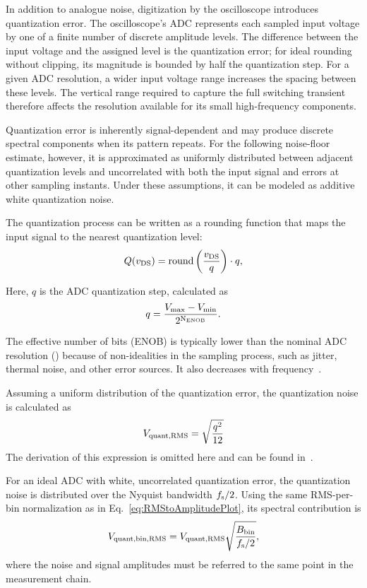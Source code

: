 In addition to analogue noise, digitization by the oscilloscope introduces quantization error.
The oscilloscope's ADC represents each sampled input voltage by one of a finite number of discrete amplitude levels.
The difference between the input voltage and the assigned level is the quantization error; for ideal rounding without clipping, its magnitude is bounded by half the quantization step.
For a given ADC resolution, a wider input voltage range increases the spacing between these levels.
The vertical range required to capture the full switching transient therefore affects the resolution available for its small high-frequency components.

Quantization error is inherently signal-dependent and may produce discrete spectral components when its pattern repeats. 
For the following noise-floor estimate, however, it is approximated as uniformly distributed between adjacent quantization levels and uncorrelated with both the input signal and errors at other sampling instants. 
Under these assumptions, it can be modeled as additive white quantization noise.

The quantization process can be written as a rounding function that maps the input signal to the nearest quantization level:
\begin{equation}
	Q({v}_{\mathrm{DS}}) = \text{round}\left(\frac{{v}_{\mathrm{DS}}}{q}\right) \cdot q,
	\label{eq:quantization}
\end{equation}

Here, $q$ is the ADC quantization step, calculated as
\begin{equation}
	q = \dfrac{{V}_{\mathrm{max}}-{V}_{\mathrm{min}}}{2^{\text{N}_{\text{ENOB}}}}.
\end{equation}

The effective number of bits (ENOB) is typically lower than the nominal ADC resolution () because of non-idealities in the sampling process, such as jitter, thermal noise, and other error sources. It also decreases with frequency~\cite{tektronix_mso_2026}.

Assuming a uniform distribution of the quantization error, the quantization noise is calculated as
\begin{equation}
	{V}_{\mathrm{quant,RMS}} = \sqrt{\frac{q^2}{12}}
\end{equation}
The derivation of this expression is omitted here and can be found in~\cite{silicon_laboratories_an118_2013}.

For an ideal ADC with white, uncorrelated quantization error, the quantization noise is distributed over the Nyquist bandwidth ${f}_{\mathrm{s}}/2$.
Using the same RMS-per-bin normalization as in Eq.~\ref{eq:RMStoAmplitudePlot}, its spectral contribution is
\begin{equation}
	{V}_{\mathrm{quant,bin,RMS}} = {V}_{\mathrm{quant,RMS}}\sqrt{\frac{{B}_{\mathrm{bin}}}{{f}_{\mathrm{s}}/2}},
\end{equation}
where the noise and signal amplitudes must be referred to the same point in the measurement chain.









